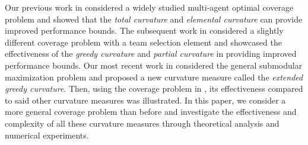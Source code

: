 \documentclass[letterpaper, 10 pt, conference]{ieeeconf}
\begin{document}
Our previous work in \cite{Sun2019} considered a widely studied multi-agent optimal coverage problem \cite{Zhong2011,Welikala2019J1} and showed that the \emph{total curvature} \cite{Conforti1984} and \emph{elemental curvature} \cite{Wang2016} can provide improved performance bounds. The subsequent work in \cite{Sun2020} considered a slightly different coverage problem with a team selection element and showcased the effectiveness of the \emph{greedy curvature} \cite{Conforti1984} and \emph{partial curvature} \cite{Liu2018} in providing improved performance bounds. Our most recent work in \cite{WelikalaJ02021} considered the general submodular maximization problem and proposed a new curvature measure called the \emph{extended greedy curvature}. Then, using the coverage problem in \cite{Sun2019}, its effectiveness compared to said other curvature measures was illustrated. 
In this paper, we consider a more general coverage problem than before and investigate the effectiveness and complexity of all these curvature measures through theoretical analysis and numerical experiments. 

   
\end{document}
